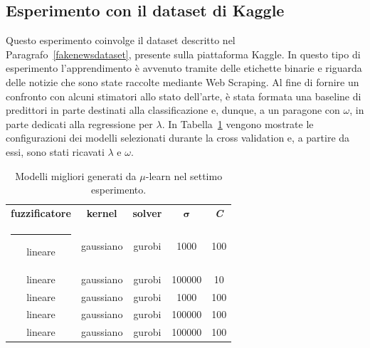 \documentclass[12pt]{report}
\makeatletter
\theoremstyle{definition}
\newcommand{\thickhline}{%
    \noalign {\ifnum 0=`}\fi \hrule height 1pt
    \futurelet \reserved@a \@xhline
}
\makeatother
\begin{document}
\subsection{Esperimento con il dataset di Kaggle}\label{kaggleexperiment}
Questo esperimento coinvolge il dataset descritto nel Paragrafo~\ref{fakenewsdataset}, presente sulla piattaforma Kaggle. In questo tipo di esperimento l'apprendimento è avvenuto tramite delle etichette binarie e riguarda delle notizie che sono state raccolte mediante Web Scraping.
Al fine di fornire un confronto con alcuni stimatori allo stato dell'arte, è stata formata una baseline di predittori in parte destinati alla classificazione e, dunque, a un paragone con $\omega$, in parte dedicati alla regressione per $\lambda$.
In Tabella~\ref{models_exp7} vengono mostrate le configurazioni dei modelli selezionati durante la cross validation e, a partire da essi, sono stati ricavati $\lambda$ e $\omega$.
\begin{table}
\centering
\begin{adjustbox}{max width=\textwidth}
 \begin{tabular}{|c|c|c|c|c|} 
 \hline
\textbf{fuzzificatore} & \textbf{kernel} & \textbf{solver} & $\bm{\sigma}$ & \textit{\textbf{C}}
\\ [0.5ex] 
 \thickhline
 lineare & gaussiano & gurobi & 1000 & 100 \\
 lineare & gaussiano & gurobi & 100000 & 10 \\
 lineare & gaussiano & gurobi & 1000 & 100 \\
 lineare & gaussiano & gurobi & 100000 & 100 \\
 lineare & gaussiano & gurobi & 100000 & 100 \\
 \hline
\end{tabular}
\end{adjustbox}
\caption{Modelli migliori generati da $\mu$-learn nel settimo esperimento.}
\label{models_exp7}
\end{table}
\end{document}
